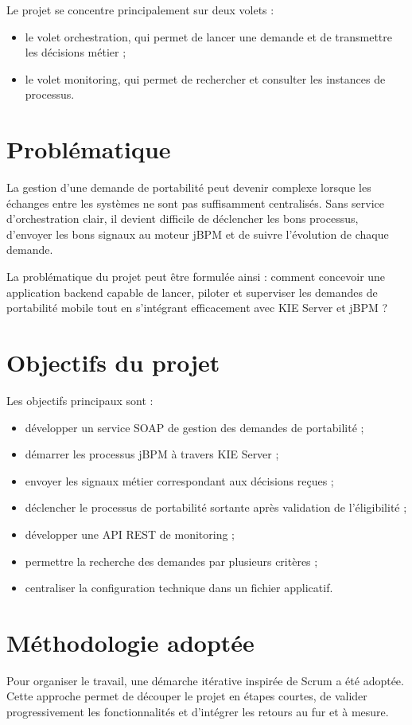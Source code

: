 \documentclass[12pt,a4paper]{report}
\begin{document}
Le projet se concentre principalement sur deux volets :
\begin{itemize}
    \item le volet orchestration, qui permet de lancer une demande et de transmettre les décisions métier ;
    \item le volet monitoring, qui permet de rechercher et consulter les instances de processus.
\end{itemize}

\section{Problématique}
La gestion d'une demande de portabilité peut devenir complexe lorsque les échanges entre les systèmes ne sont pas suffisamment centralisés. Sans service d'orchestration clair, il devient difficile de déclencher les bons processus, d'envoyer les bons signaux au moteur jBPM et de suivre l'évolution de chaque demande.

La problématique du projet peut être formulée ainsi : comment concevoir une application backend capable de lancer, piloter et superviser les demandes de portabilité mobile tout en s'intégrant efficacement avec KIE Server et jBPM ?

\section{Objectifs du projet}
Les objectifs principaux sont :
\begin{itemize}
    \item développer un service SOAP de gestion des demandes de portabilité ;
    \item démarrer les processus jBPM à travers KIE Server ;
    \item envoyer les signaux métier correspondant aux décisions reçues ;
    \item déclencher le processus de portabilité sortante après validation de l'éligibilité ;
    \item développer une API REST de monitoring ;
    \item permettre la recherche des demandes par plusieurs critères ;
    \item centraliser la configuration technique dans un fichier applicatif.
\end{itemize}

\section{Méthodologie adoptée}
Pour organiser le travail, une démarche itérative inspirée de Scrum a été adoptée. Cette approche permet de découper le projet en étapes courtes, de valider progressivement les fonctionnalités et d'intégrer les retours au fur et à mesure.
\end{document}

